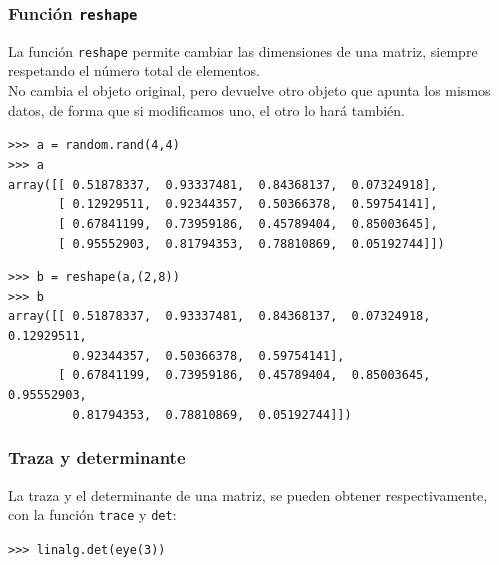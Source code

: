 \begin{frame}
\frametitle{Función \texttt{reshape}}
La función \texttt{reshape} permite cambiar las dimensiones de una matriz, siempre respetando el número total de elementos.
\\
\bigskip
No cambia el objeto original, pero devuelve otro objeto que apunta los mismos datos, de forma que si modificamos uno, el otro lo hará también.
\end{frame}
\begin{frame}[fragile]
\verb|>>> a = random.rand(4,4)| \\
\fontsize{10}{10}\selectfont
\pause
\verb|>>> a| \\
\verb|array([[ 0.51878337,  0.93337481,  0.84368137,  0.07324918],| \\
\verb|       [ 0.12929511,  0.92344357,  0.50366378,  0.59754141],| \\
\verb|       [ 0.67841199,  0.73959186,  0.45789404,  0.85003645],| \\
\verb|       [ 0.95552903,  0.81794353,  0.78810869,  0.05192744]])|
\end{frame}
\begin{frame}[fragile]
\verb|>>> b = reshape(a,(2,8))| \\
\fontsize{10}{10}\selectfont
\pause
\verb|>>> b| \\
\pause
\verb|array([[ 0.51878337,  0.93337481,  0.84368137,  0.07324918,  0.12929511,| \\
\verb|         0.92344357,  0.50366378,  0.59754141],| \\
\verb|       [ 0.67841199,  0.73959186,  0.45789404,  0.85003645,  0.95552903,| \\
\verb|         0.81794353,  0.78810869,  0.05192744]])|
\end{frame}
\begin{frame}[fragile]
\frametitle{Traza y determinante}
La traza y el determinante de una matriz, se pueden obtener respectivamente, con la función \texttt{trace} y \texttt{det}:
\begin{exampleblock}{}
\verb|>>> linalg.det(eye(3))| \\
 \\
 \\
\end{exampleblock}
\end{frame}

